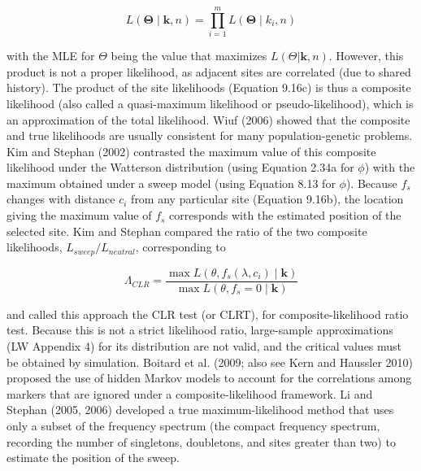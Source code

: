 \documentclass{article}
\begin{document}
\begin{equation}
L(\boldsymbol{\Theta}\mid\mathbf{k},n)=\prod_{i=1}^{m}L(\boldsymbol{\Theta}\mid k_{i},n)
\tag{9.16c}
\label{eq:9_16c}
\end{equation}

with the MLE for $\Theta$ being the value that maximizes $L(\Theta|\mathbf{k},n)$. However, this product is not a proper likelihood, as adjacent sites are correlated (due to shared history). The product of the site likelihoods (Equation 9.16c) is thus a composite likelihood (also called a quasi-maximum likelihood or pseudo-likelihood), which is an approximation of the total likelihood. Wiuf (2006) showed that the composite and true likelihoods are usually consistent for many population-genetic problems. Kim and Stephan (2002) contrasted the maximum value of this composite likelihood under the Watterson distribution (using Equation 2.34a for $\phi$) with the maximum obtained under a sweep model (using Equation 8.13 for $\phi$). Because $f_s$ changes with distance $c_i$ from any particular site (Equation 9.16b), the location giving the maximum value of $f_s$ corresponds with the estimated position of the selected site. Kim and Stephan compared the ratio of the two composite likelihoods, $L_{sweep}/L_{neutral}$, corresponding to

\begin{equation}
\Lambda_{CLR}=\frac{\max L(\theta,f_{s}(\lambda,c_{i})\mid\mathbf{k})}{\max L(\theta,f_{s}=0\mid\mathbf{k})}
\tag{9.16d}
\label{eq:9_16d}
\end{equation}

and called this approach the CLR test (or CLRT), for composite-likelihood ratio test. Because this is not a strict likelihood ratio, large-sample approximations (LW Appendix 4) for its distribution are not valid, and the critical values must be obtained by simulation. Boitard et al. (2009; also see Kern and Haussler 2010) proposed the use of hidden Markov models to account for the correlations among markers that are ignored under a composite-likelihood framework. Li and Stephan (2005, 2006) developed a true maximum-likelihood method that uses only a subset of the frequency spectrum (the compact frequency spectrum, recording the number of singletons, doubletons, and sites greater than two) to estimate the position of the sweep.
\end{document}
